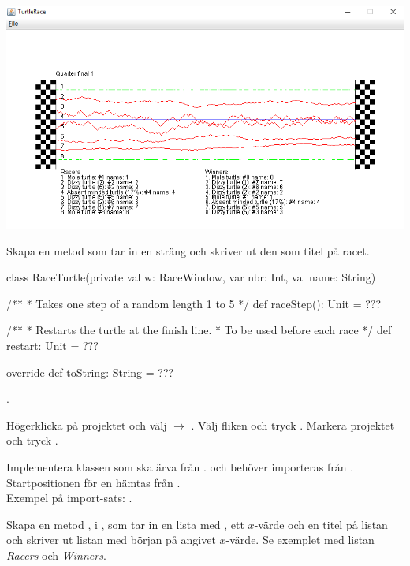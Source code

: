 \includegraphics[width=\textwidth]{../img/turtlerace/RaceWindow}

\Subtask Skapa en metod  som tar in en sträng och skriver ut den som titel på racet.

\begin{Code}
class RaceTurtle(private val w: RaceWindow,
			var nbr: Int, val name: String) {
  /**
   * Takes one step of a random length 1 to 5
   */
  def raceStep(): Unit = ???

  /**
   * Restarts the turtle at the finish line.
   * To be used before each race
   */
  def restart: Unit = ???

  override def toString: String = ???
}
\end{Code}

\Task {}.

\Subtask Högerklicka på projektet  och välj  $\rightarrow$ . Välj fliken  och tryck . Markera projektet  och tryck .

\Subtask Implementera klassen  som ska ärva från .  och  behöver importeras från . Startpositionen för en  hämtas från .\\Exempel på import-sats: .

\Subtask Skapa en metod , i , som tar in en lista med , ett $x$-värde och en titel på listan och skriver ut listan med början på angivet $x$-värde. Se exemplet med listan \textit{Racers} och \textit{Winners}.

\Task {}

